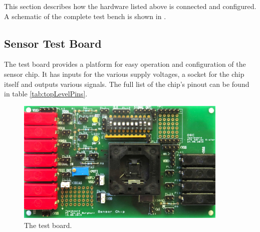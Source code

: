 This  section  describes  how  the  hardware listed  above  is  connected  and
configured. A   schematic   of  the   complete   test   bench  is   shown   in
.

%    


\subsection{Sensor Test Board}
\label{subsec:testBoard}

The test board provides a platform for easy operation and configuration of the
sensor chip. It has  inputs for the various supply voltages,  a socket for the
chip itself  and outputs various signals. The  full list of the  chip's pinout
can be found in table \ref{tab:topLevelPins}.


\begin{figure}
    \centering
    \includegraphics[width=0.9\textwidth]{images/pcb/pcbOverview}
    \caption{The test board.}
    \label{fig:testBoard}
\end{figure}

